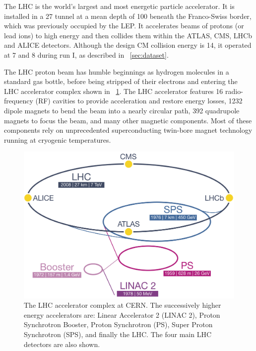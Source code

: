 
The \ac{LHC} is the world's largest and most energetic particle accelerator. It is 
installed in a \unit{27}{\kilo\metre} tunnel at a mean depth of \unit{100}{\metre} beneath 
the Franco-Swiss border, which was previously occupied by the \ac{LEP}. It accelerates 
beams of protons (or lead ions) to high energy and then collides them within the
ATLAS, CMS, LHCb and ALICE detectors. Although the design \ac{CM} collision energy is 
\unit{14}{\TeV}, it operated at \unit{7}{\TeV} and \unit{8}{\TeV} during run I, as 
described in \Section~\ref{sec:dataset}.

The \ac{LHC} proton beam has humble beginnings as hydrogen molecules in a standard gas 
bottle, before being stripped of their electrons and entering the \ac{LHC} accelerator 
complex shown in \Figure~\ref{fig:lhc}. The \ac{LHC} accelerator features 16 
radio-frequency (RF) cavities to provide acceleration and restore energy losses, 1232 
dipole magnets to bend the beam into a nearly circular path, 392 quadrupole magnets to 
focus the beam, and many other magnetic components. Most of these components rely on 
unprecedented superconducting twin-bore magnet technology running at cryogenic 
temperatures.

\begin{figure}
	\includegraphics[width=\largefigwidth]{tex/experiment/lhc}
	\caption{The \ac{LHC} accelerator complex at CERN. The successively higher energy 
	accelerators are: Linear Accelerator 2 (LINAC 2), Proton Synchrotron Booster, Proton 
	Synchrotron (PS), Super Proton Synchrotron (SPS), and finally the \acf{LHC}. The four 
	main \ac{LHC} detectors are also shown.}
	\label{fig:lhc}
\end{figure}

